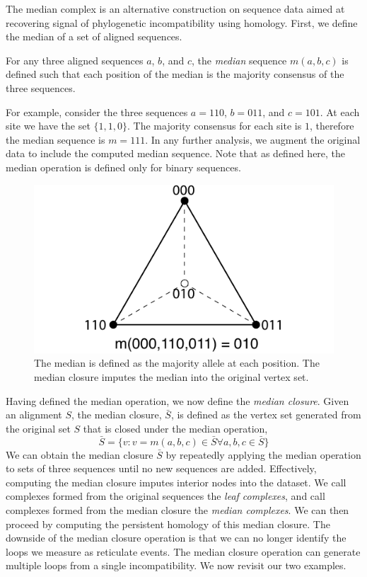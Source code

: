 The median complex is an alternative construction on sequence data aimed at recovering signal of phylogenetic incompatibility using homology.
First, we define the median of a set of aligned sequences.

\begin{defn}
  \label{defn:median}
  For any three aligned sequences $a$, $b$, and $c$, the \emph{median} sequence $m(a,b,c)$ is defined such that each position of the median is the majority consensus of the three sequences.
\end{defn}

For example, consider the three sequences $a=110$, $b=011$, and $c=101$.
At each site we have the set $\{1,1,0\}$.
The majority consensus for each site is $1$, therefore the median sequence is $m=111$.
In any further analysis, we augment the original data to include the computed median sequence.
Note that as defined here, the median operation is defined only for binary sequences.

\begin{figure}
\centering
\includegraphics[width=.75\columnwidth]{./fig/complex_construction/median.pdf}
\caption[The Median Operation on Binary Sequences]{The median is defined as the majority allele at each position. The median closure imputes the median into the original vertex set.}
\label{fig:complex_construction:median}
\end{figure}

Having defined the median operation, we now define the \emph{median closure}.
Given an alignment $S$, the median closure, $\bar{S}$, is defined as the vertex set generated from the original set $S$ that is closed under the median operation,
\begin{equation}
\bar{S} = \{v \colon v=m(a,b,c) \in \bar{S} \forall a,b,c \in \bar{S}\}
\end{equation}
We can obtain the median closure $\bar{S}$ by repeatedly applying the median operation to sets of three sequences until no new sequences are added.
Effectively, computing the median closure imputes interior nodes into the dataset.
We call complexes formed from the original sequences the \emph{leaf complexes}, and call complexes formed from the median closure the \emph{median complexes}.
We can then proceed by computing the persistent homology of this median closure.
The downside of the median closure operation is that we can no longer identify the loops we measure as reticulate events.
The median closure operation can generate multiple loops from a single incompatibility.
We now revisit our two examples.

